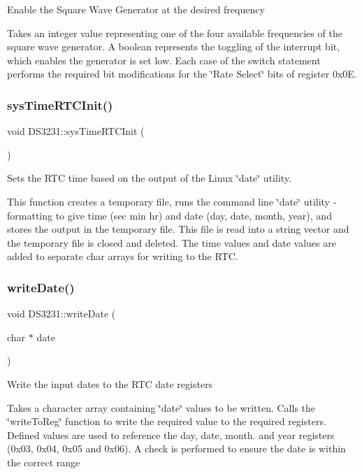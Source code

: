 Enable the Square Wave Generator at the desired frequency

Takes an integer value representing one of the four available frequencies of the square wave generator. A boolean represents the toggling of the interrupt bit, which enables the generator is set low. Each case of the switch statement performs the required bit modifications for the \char`\"{}\+Rate Select\char`\"{} bits of register 0x0E.\mbox{\label{classDS3231_ae7630e2f75c91d116f503292163fc2e9}} 
\subsubsection{\texorpdfstring{sys\+Time\+R\+T\+C\+Init()}{sysTimeRTCInit()}}
{\footnotesize\ttfamily void D\+S3231\+::sys\+Time\+R\+T\+C\+Init (\begin{DoxyParamCaption}{ }\end{DoxyParamCaption})}

Sets the R\+TC time based on the output of the Linux \char`\"{}date\char`\"{} utility.

This function creates a temporary file, runs the command line \char`\"{}date\char`\"{} utility -\/ formatting to give time (sec min hr) and date (day, date, month, year), and stores the output in the temporary file. This file is read into a string vector and the temporary file is closed and deleted. The time values and date values are added to separate char arrays for writing to the R\+TC.\mbox{\label{classDS3231_aa8b6b1279d7f7e04cd4a3797d620cf61}} 
\subsubsection{\texorpdfstring{write\+Date()}{writeDate()}}
{\footnotesize\ttfamily void D\+S3231\+::write\+Date (\begin{DoxyParamCaption}\item[{char $\ast$}]{date }\end{DoxyParamCaption})}

Write the input dates to the R\+TC date registers

Takes a character array containing \char`\"{}date\char`\"{} values to be written. Calls the \char`\"{}write\+To\+Reg\char`\"{} function to write the required value to the required registers. Defined values are used to reference the day, date, month. and year registers (0x03, 0x04, 0x05 and 0x06). A check is performed to ensure the date is within the correct range\mbox{\label{classDS3231_a8780408536a9eedfe2f04d4085a103b0}} 

